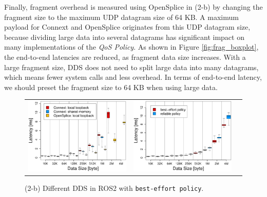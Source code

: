 \documentclass{sig-alternate-05-2015}
\begin{document}
Finally, fragment overhead is measured using OpenSplice in (2-b) by changing the fragment size to the maximum UDP datagram size of 64 KB. 
A maximum payload for Connext and OpenSplice originates from this UDP datagram size, because dividing large data into several datagrams has significant impact on many implementations of the \emph{QoS Policy}.
As shown in Figure \ref{fig:frag_boxplot}, the end-to-end latencies are reduced, as fragment data size increases.
With a large fragment size, DDS does not need to split large data into many datagrams, which means fewer system calls and less overhead.
In terms of end-to-end latency, we should preset the fragment size to 64 KB when using large data.
\begin{figure}[t]
  \begin{tabular}{ccc}
    \begin{minipage}[t]{0.31\textwidth}
      \includegraphics[width=1.0\linewidth]{../figure/comparison_DDS_BoxPlot.eps}
      \caption{(2-b) Different DDS in ROS2 with \texttt{best-effort policy}.}
      \label{fig:dds_boxplot}
    \end{minipage}
    &
    \begin{minipage}[t]{0.31\textwidth}
      \includegraphics[width=1.0\linewidth]{../figure/comparison_qos_BoxPlot.eps}

\end{minipage}
\end{tabular}
\end{figure}
\end{document}
